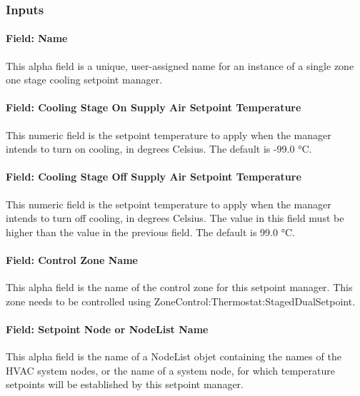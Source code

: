 \subsubsection{Inputs}\label{inputs-25-002}

\paragraph{Field: Name}\label{field-name-25-001}

This alpha field is a unique, user-assigned name for an instance of a single zone one stage cooling setpoint manager.

\paragraph{Field: Cooling Stage On Supply Air Setpoint Temperature}\label{field-cooling-stage-on-supply-air-setpoint-temperature}

This numeric field is the setpoint temperature to apply when the manager intends to turn on cooling, in degrees Celsius. The default is -99.0 °C.

\paragraph{Field: Cooling Stage Off Supply Air Setpoint Temperature}\label{field-cooling-stage-off-supply-air-setpoint-temperature}

This numeric field is the setpoint temperature to apply when the manager intends to turn off cooling, in degrees Celsius. The value in this field must be higher than the value in the previous field. The default is 99.0 °C.

\paragraph{Field: Control Zone Name}\label{field-control-zone-name-3}

This alpha field is the name of the control zone for this setpoint manager. This zone needs to be controlled using ZoneControl:Thermostat:StagedDualSetpoint.

\paragraph{Field: Setpoint Node or NodeList Name}\label{field-setpoint-node-or-nodelist-name-20}

This alpha field is the name of a NodeList objet containing the names of the HVAC system nodes, or the name of a system node, for which temperature setpoints will be established by this setpoint manager.

